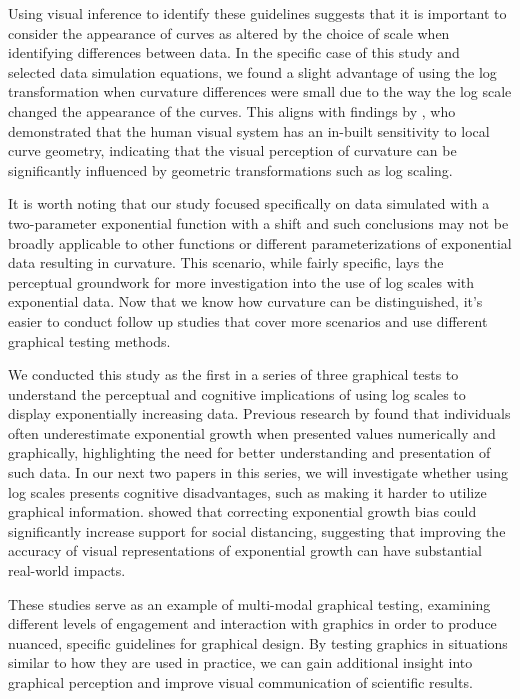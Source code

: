 \documentclass[12pt]{article}
\begin{document}
Using visual inference to identify these guidelines suggests that it is
important to consider the appearance of curves as altered by the choice
of scale when identifying differences between data. In the specific case
of this study and selected data simulation equations, we found a slight
advantage of using the log transformation when curvature differences
were small due to the way the log scale changed the appearance of the
curves. This aligns with findings by \citet{dresp20152d}, who
demonstrated that the human visual system has an in-built sensitivity to
local curve geometry, indicating that the visual perception of curvature
can be significantly influenced by geometric transformations such as log
scaling.

It is worth noting that our study focused specifically on data simulated
with a two-parameter exponential function with a shift and such
conclusions may not be broadly applicable to other functions or
different parameterizations of exponential data resulting in curvature.
This scenario, while fairly specific, lays the perceptual groundwork for
more investigation into the use of log scales with exponential data. Now
that we know how curvature can be distinguished, it's easier to conduct
follow up studies that cover more scenarios and use different graphical
testing methods.

We conducted this study as the first in a series of three graphical
tests to understand the perceptual and cognitive implications of using
log scales to display exponentially increasing data. Previous research
by \citet{ciccione2022analyzing} found that individuals often
underestimate exponential growth when presented values numerically and
graphically, highlighting the need for better understanding and
presentation of such data. In our next two papers in this series, we
will investigate whether using log scales presents cognitive
disadvantages, such as making it harder to utilize graphical
information. \citet{lammers2020correcting} showed that correcting
exponential growth bias could significantly increase support for social
distancing, suggesting that improving the accuracy of visual
representations of exponential growth can have substantial real-world
impacts.

These studies serve as an example of multi-modal graphical testing,
examining different levels of engagement and interaction with graphics
in order to produce nuanced, specific guidelines for graphical design.
By testing graphics in situations similar to how they are used in
practice, we can gain additional insight into graphical perception and
improve visual communication of scientific results.
\end{document}

